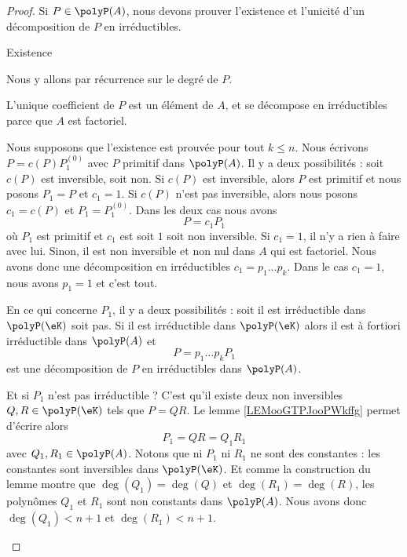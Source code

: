 \begin{proof}
	Si \( P\in\polyP(A)\), nous devons prouver l'existence et l'unicité d'un décomposition de \( P\) en irréductibles.
	\begin{proofpart}
		Existence
	\end{proofpart}

	Nous y allons par récurrence sur le degré de \( P\).

	\begin{subproof}
		\spitem[Si \( \deg(P)=0\)]
		L'unique coefficient de \( P\) est un élément de \( A\), et se décompose en irréductibles parce que \( A\) est factoriel.

		\spitem[Si \( \deg(P)=n+1\)]
		Nous supposons que l'existence est prouvée pour tout \( k\leq n\). Nous écrivons \( P=c(P)P^{(0)}_1\) avec \( P\) primitif dans \( \polyP(A)\). Il y a deux possibilités : soit \( c(P)\) est inversible, soit non. Si \( c(P)\) est inversible, alors \( P\) est primitif et nous posons \( P_1=P\) et \( c_1=1\). Si \( c(P)\) n'est pas inversible, alors nous posons \( c_1=c(P)\) et \( P_1=P^{(0)}_1\). Dans les deux cas nous avons
		\begin{equation}
			P=c_1P_1
		\end{equation}
		où \( P_1\) est primitif et \( c_1\) est soit \( 1\) soit non inversible. Si \( c_1=1\), il n'y a rien à faire avec lui. Sinon, il est non inversible et non nul dans \( A\) qui est factoriel. Nous avons donc une décomposition en irréductibles \( c_1=p_1\ldots p_k\). Dans le cas \( c_1=1\), nous avons \( p_1=1\) et c'est tout.

		En ce qui concerne \( P_1\), il y a deux possibilités : soit il est irréductible dans \( \polyP(\eK)\) soit pas. Si il est irréductible dans \( \polyP(\eK)\) alors il est à fortiori irréductible dans \( \polyP(A)\) et
		\begin{equation}
			P=p_1\ldots p_kP_1
		\end{equation}
		est une décomposition de \( P\) en irréductibles dans \( \polyP(A)\).

		Et si \( P_1\) n'est pas irréductible ? C'est qu'il existe deux non inversibles \( Q,R\in \polyP(\eK)\) tels que \( P=QR\). Le lemme \ref{LEMooGTPJooPWkffg} permet d'écrire alors
		\begin{equation}
			P_1=QR=Q_1R_1
		\end{equation}
		avec \( Q_1,R_1\in \polyP(A)\). Notons que ni \( P_1\) ni \( R_1\) ne sont des constantes : les constantes sont inversibles dans \( \polyP(\eK)\). Et comme la construction du lemme montre que \( \deg(Q_1)=\deg(Q)\) et \( \deg(R_1)=\deg(R)\), les polynômes \( Q_1\) et \( R_1\) sont non constants dans \( \polyP(A)\). Nous avons donc \( \deg(Q_1)<n+1\) et \( \deg(R_1)<n+1\).


\end{subproof}
\end{proof}
